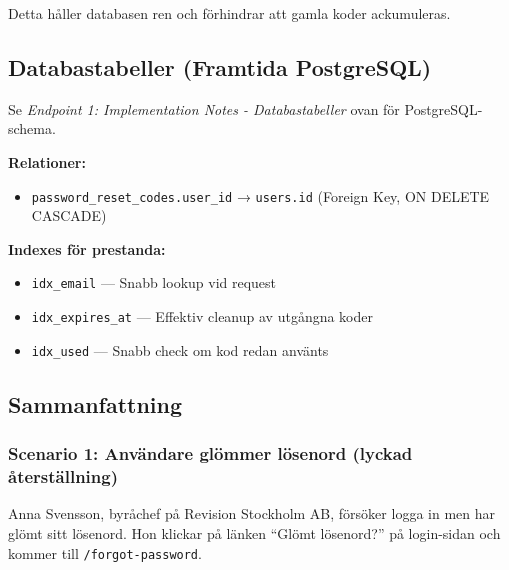 \documentclass[12pt,a4paper]{article}
\begin{document}
Detta håller databasen ren och förhindrar att gamla koder ackumuleras.

\subsection{Databastabeller (Framtida PostgreSQL)}

Se \textit{Endpoint 1: Implementation Notes - Databastabeller} ovan för PostgreSQL-schema.

\textbf{Relationer:}
\begin{itemize}[noitemsep]
  \item \texttt{password\_reset\_codes.user\_id} → \texttt{users.id} (Foreign Key, ON DELETE CASCADE)
\end{itemize}

\textbf{Indexes för prestanda:}
\begin{itemize}[noitemsep]
  \item \texttt{idx\_email} — Snabb lookup vid request
  \item \texttt{idx\_expires\_at} — Effektiv cleanup av utgångna koder
  \item \texttt{idx\_used} — Snabb check om kod redan använts
\end{itemize}

\subsection{Sammanfattning}

\subsubsection{Scenario 1: Användare glömmer lösenord (lyckad återställning)}

Anna Svensson, byråchef på Revision Stockholm AB, försöker logga in men har glömt sitt lösenord. Hon klickar på länken ``Glömt lösenord?'' på login-sidan och kommer till \texttt{/forgot-password}.
\end{document}
